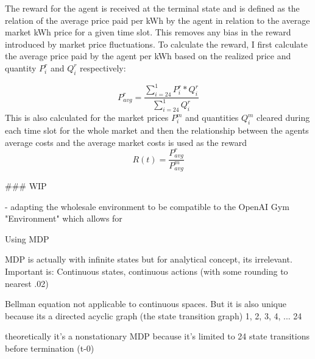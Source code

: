 The reward for the agent is received at the terminal state and is defined as the relation of the average price paid per
\ac{kWh} by the agent in relation to the average market \ac{kWh} price for a given time slot. This removes any bias in
the reward introduced by market price fluctuations. To calculate the reward, I first calculate the average price paid by
the agent per \ac{kWh} based on the realized price and quantity $P^r_i$ and $Q^r_i$ respectively:

\begin{equation}
    \label{eq:Average price per kWh for a given target time slot}
    P^{r}_{avg} =\frac{\sum ^{1}_{i=24} P^{r}_{i} *Q^{r}_{i}}{\sum ^{1}_{i=24} Q^{r}_{i}}


\end{equation}
This is also calculated for the market prices $P^m_{i}$ and quantities $Q^m_i$ cleared during each time slot for the whole market and then the
relationship between the agents average costs and the average market costs is used as the reward
\begin{equation}
    R(t) = \frac{P^r_{avg}}{P^m_{avg}}
\end{equation}

\begin{markdown}

    ### WIP

    - adapting the wholesale environment to be  compatible to the OpenAI Gym "Environment" which allows for

\end{markdown}


Using \ac{MDP}

\ac{MDP} is actually with infinite states but for analytical concept, its irrelevant. Important is: Continuous states,
continuous actions (with some rounding to nearest .02)

Bellman equation not applicable to continuous spaces. But it is also unique because its a directed acyclic graph (the
state transition graph) 1, 2, 3, 4, ... 24

theoretically it's a nonstationary \ac{MDP} because it's limited to 24 state transitions before termination (t-0)


